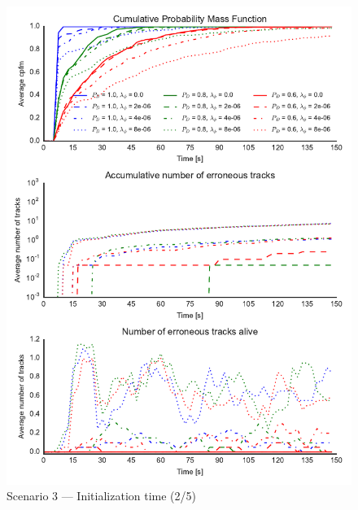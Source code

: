 \begin{figure}
\centering
\includegraphics{Figures/plots/Scenario3_Init-Time(2-5).pdf}
\caption{Scenario 3 --- Initialization time (2/5)}\label{fig:init3_time_2-5}
\end{figure}


